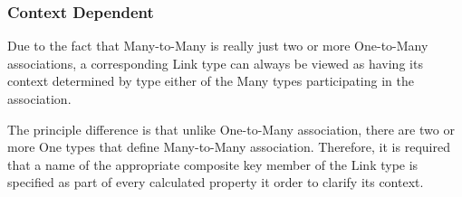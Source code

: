   \subsubsection{Context Dependent}

  Due to the fact that Many-to-Many is really just two or more One-to-Many associations, a corresponding Link type can always be viewed as having its context determined by type either of the Many types participating in the association.

  The principle difference is that unlike One-to-Many association, there are two or more One types that define Many-to-Many association. Therefore, it is required that a name of the appropriate composite key member of the Link type is specified as part of every calculated property it order to clarify its context.

% 
% 
% 
% 
% 
  